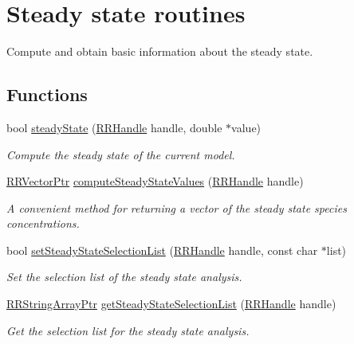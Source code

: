 \hypertarget{group__steadystate}{\section{Steady state routines}
\label{group__steadystate}
}


Compute and obtain basic information about the steady state.  


\subsection*{Functions}
\begin{DoxyCompactItemize}
\item 
bool \hyperlink{group__steadystate_ga6585d37a9c56840e1acbb38e9df07262}{steady\-State} (\hyperlink{rrc__types_8h_a1d68f0592372208fa5a5f2799ea4b3ae}{R\-R\-Handle} handle, double $\ast$value)
\begin{DoxyCompactList}\small\item\em Compute the steady state of the current model. \end{DoxyCompactList}\item 
\hyperlink{rrc__types_8h_a3be72d6006034fd349f753d2bf441bf7}{R\-R\-Vector\-Ptr} \hyperlink{group__steadystate_gac30f43194bb3045396e40cc6c0ffa24d}{compute\-Steady\-State\-Values} (\hyperlink{rrc__types_8h_a1d68f0592372208fa5a5f2799ea4b3ae}{R\-R\-Handle} handle)
\begin{DoxyCompactList}\small\item\em A convenient method for returning a vector of the steady state species concentrations. \end{DoxyCompactList}\item 
bool \hyperlink{group__steadystate_ga9b9f94c413981a2e1e9df3c6ea43ce4a}{set\-Steady\-State\-Selection\-List} (\hyperlink{rrc__types_8h_a1d68f0592372208fa5a5f2799ea4b3ae}{R\-R\-Handle} handle, const char $\ast$list)
\begin{DoxyCompactList}\small\item\em Set the selection list of the steady state analysis. \end{DoxyCompactList}\item 
\hyperlink{rrc__types_8h_a7c9475df6c7337d99482b13a365e7596}{R\-R\-String\-Array\-Ptr} \hyperlink{group__steadystate_gac90278de49539b861fdde7d7d0a51918}{get\-Steady\-State\-Selection\-List} (\hyperlink{rrc__types_8h_a1d68f0592372208fa5a5f2799ea4b3ae}{R\-R\-Handle} handle)
\begin{DoxyCompactList}\small\item\em Get the selection list for the steady state analysis. \end{DoxyCompactList}\end{DoxyCompactItemize}


